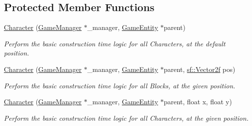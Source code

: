\subsection*{Protected Member Functions}
\begin{DoxyCompactItemize}
\item 
\mbox{\hyperlink{class_character_ad6234cbdd8a67b0fd74289c725ad4395}{Character}} (\mbox{\hyperlink{class_game_manager}{Game\+Manager}} $\ast$\+\_\+manager, \mbox{\hyperlink{class_game_entity}{Game\+Entity}} $\ast$parent)
\begin{DoxyCompactList}\small\item\em Perform the basic construction time logic for all Characters, at the default position. \end{DoxyCompactList}\item 
\mbox{\hyperlink{class_character_a940ba50598ff17e5b1040545d61c9328}{Character}} (\mbox{\hyperlink{class_game_manager}{Game\+Manager}} $\ast$\+\_\+manager, \mbox{\hyperlink{class_game_entity}{Game\+Entity}} $\ast$parent, \mbox{\hyperlink{classsf_1_1_vector2}{sf\+::\+Vector2f}} pos)
\begin{DoxyCompactList}\small\item\em Perform the basic construction time logic for all Blocks, at the given position. \end{DoxyCompactList}\item 
\mbox{\hyperlink{class_character_a443cbaba168bf9fe441db55a76c1b19c}{Character}} (\mbox{\hyperlink{class_game_manager}{Game\+Manager}} $\ast$\+\_\+manager, \mbox{\hyperlink{class_game_entity}{Game\+Entity}} $\ast$parent, float x, float y)
\begin{DoxyCompactList}\small\item\em Perform the basic construction time logic for all Characters, at the given position. \end{DoxyCompactList}\end{DoxyCompactItemize}
